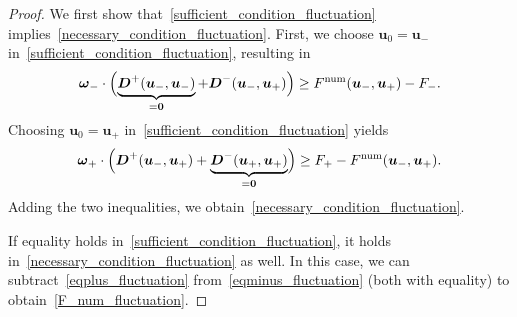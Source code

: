 \documentclass[]{scrartcl}
\renewcommand{\vec}[1]{\boldsymbol{#1}}
\theoremstyle{definition}
\begin{document}
\begin{proof}
We first show that~\eqref{sufficient_condition_fluctuation} implies~\eqref{necessary_condition_fluctuation}.
First, we choose $\vec{u}_0 = \vec{u}_-$ in~\eqref{sufficient_condition_fluctuation}, resulting in
\begin{equation}
\vec{\omega}_- \cdot \Bigl (\underbrace{\vec{D}^+(\vec{u}_-, \vec{u}_-)}_{= \vec{0}} + \vec{D}^-(\vec{u}_-, \vec{u}_+)\Bigr ) \geq F^{\mathrm{num}}(\vec{u}_-, \vec{u}_+) - F_-.
\label{eqminus_fluctuation}
\end{equation}
Choosing $\vec{u}_0 = \vec{u}_+$ in~\eqref{sufficient_condition_fluctuation} yields
\begin{equation}
\vec{\omega}_+ \cdot \Bigl (\vec{D}^+(\vec{u}_-, \vec{u}_+) + \underbrace{\vec{D}^-(\vec{u}_+, \vec{u}_+)}_{= \vec{0}} \Bigr ) \geq F_+ - F^{\mathrm{num}}(\vec{u}_-, \vec{u}_+).
\label{eqplus_fluctuation}
\end{equation}
Adding the two inequalities, we obtain~\eqref{necessary_condition_fluctuation}.

If equality holds in~\eqref{sufficient_condition_fluctuation}, it holds in~\eqref{necessary_condition_fluctuation} as well.
In this case, we can subtract~\eqref{eqplus_fluctuation} from~\eqref{eqminus_fluctuation} (both with equality) to obtain~\eqref{F_num_fluctuation}.


\end{proof}
\end{document}
